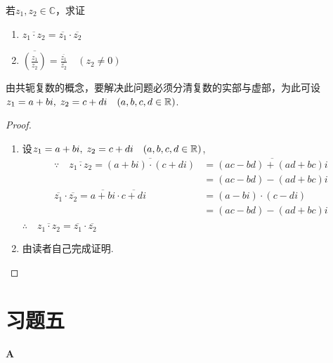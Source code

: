 \begin{example}
    若$z_1,z_2\in\mathbb{C}$，求证
\begin{multicols}{2}
    \begin{enumerate}[(1)]
        \item $\overline{z_1\cdot z_2}=\overline{z_1}\cdot \overline{z_2}$
        \item $\overline{\left(\frac{z_1}{z_2}\right)}=\frac{\overline{z_1}}{\overline{z_2}}\quad (z_2\ne 0)$
    \end{enumerate}
\end{multicols}
\end{example}

\begin{analyze}
由共轭复数的概念，要解决此问题必须分清复数的实部与虚部，为此可设$z_1=a+bi,\; z_2=c+di\quad (a,b,c,d\in\mathbb{R})$.
\end{analyze}

\begin{proof}
\begin{enumerate}[(1)]
    \item 设$z_1=a+bi,\; z_2=c+di\quad (a,b,c,d\in\mathbb{R})$,
\[\begin{split}
    \because\quad \overline{z_1\cdot z_2}=\overline{(a+bi)\cdot (c+di)}
    &=\overline{(ac-bd)+(ad+bc)i}\\
    &=(ac-bd)-(ad+bc)i\\
    \overline{z_1}\cdot \overline{z_2}=\overline{a+bi}\cdot \overline{c+di}
    &=(a-bi)\cdot (c-di)\\
    &=(ac-bd)-(ad+bc)i\\
\end{split}\]
$\therefore\quad \overline{z_1\cdot z_2}=\overline{z_1}\cdot \overline{z_2}$

\item 由读者自己完成证明.
\end{enumerate}    
\end{proof}

\section*{习题五}
\begin{center}
    \bfseries A
\end{center}


